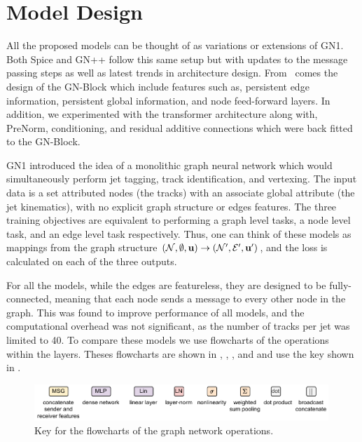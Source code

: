 \section{Model Design}

All the proposed models can be thought of as variations or extensions of GN1.
Both Spice and GN++ follow this same setup but with updates to the message passing steps as well as latest trends in architecture design.
From~\textcite{RelationalInductiveBiases} comes the design of the GN-Block which include features such as, persistent edge information, persistent global information, and node feed-forward layers.
In addition, we experimented with the transformer architecture along with, PreNorm, conditioning, and residual additive connections which were back fitted to the GN-Block.

GN1 introduced the idea of a monolithic graph neural network which would simultaneously perform jet tagging, track identification, and vertexing.
The input data is a set attributed nodes (the tracks) with an associate global attribute (the jet kinematics), with no explicit graph structure or edges features.
The three training objectives are equivalent to performing a graph level tasks, a node level task, and an edge level task respectively.
Thus, one can think of these models as mappings from the graph structure $(\mathcal{N}, \emptyset, \mathbf{u}) \rightarrow (\mathcal{N}', \mathcal{E}', \mathbf{u}')$, and the loss is calculated on each of the three outputs.

For all the models, while the edges are featureless, they are designed to be fully-connected, meaning that each node sends a message to every other node in the graph.
This was found to improve performance of all models, and the computational overhead was not significant, as the number of tracks per jet was limited to 40.
To compare these models we use flowcharts of the operations within the layers.
Theses flowcharts are shown in , , , and  and use the key shown in .

\begin{figure}
    \centering
    \includegraphics[width=0.99\textwidth]{figures/flavour_tagging/key.pdf}
    \caption{Key for the flowcharts of the graph network operations.}
    \label{fig:key}
\end{figure}

